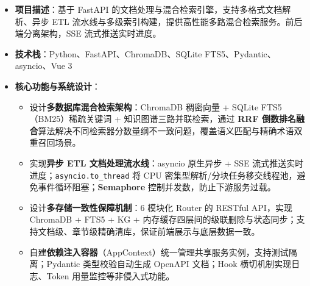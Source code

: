   \begin{itemize}
      \item \textbf{项目描述}：基于 FastAPI 的文档处理与混合检索引擎，支持多格式文档解析、异步 ETL 流水线与多级索引构建，提供高性能多路混合检索服务。前后端分离架构，SSE 流式推送实时进度。
      \item \textbf{技术栈}：Python、FastAPI、ChromaDB、SQLite FTS5、Pydantic、asyncio、Vue 3
      \item \textbf{核心功能与系统设计}：
      \begin{itemize}
          \item 设计\textbf{多数据库混合检索架构}：ChromaDB 稠密向量 + SQLite FTS5（BM25）稀疏关键词 + 知识图谱三路并联检索，通过 \textbf{RRF 倒数排名融合}算法解决不同检索器分数量纲不一致问题，覆盖语义匹配与精确术语双重召回场景。

          \item 实现\textbf{异步 ETL 文档处理流水线}：asyncio 原生异步 + SSE 流式推送实时进度；\texttt{asyncio.to\_thread} 将 CPU 密集型解析/分块任务移交线程池，避免事件循环阻塞；\textbf{Semaphore} 控制并发数，防止下游服务过载。

          \item 设计\textbf{多存储一致性保障机制}：6 模块化 Router 的 RESTful API，实现 ChromaDB + FTS5 + KG + 内存缓存四层间的级联删除与状态同步；支持文档级、章节级精确清库，保证前端展示与底层数据一致。

          \item 自建\textbf{依赖注入容器}（AppContext）统一管理共享服务实例，支持测试隔离；Pydantic 类型校验自动生成 OpenAPI 文档；Hook 横切机制实现日志、Token 用量监控等非侵入式功能。
      \end{itemize}
  \end{itemize}
